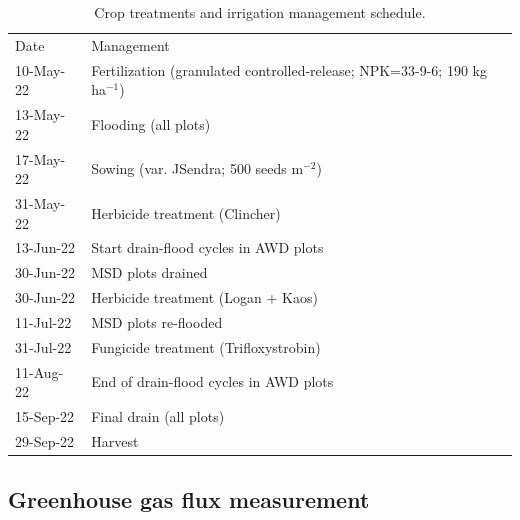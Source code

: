 \begin{table} [htbp]
    \centering
    \footnotesize  
        \caption{Crop treatments and irrigation management schedule.}
    \begin{tabular}{l l}
\cline{1-2}
{Date} & {Management} \\
\cline{1-2}
{10-May-22} & {Fertilization (granulated controlled-release; NPK=33-9-6; 190 kg ha$^{-1}$)} \\
{13-May-22} & {Flooding (all plots)} \\
{17-May-22} & {Sowing (var. JSendra; 500 seeds m$^{-2}$)} \\
{31-May-22} & {Herbicide treatment (Clincher)} \\
{13-Jun-22} & {Start drain-flood cycles in  AWD plots} \\
{30-Jun-22} & {MSD plots drained} \\
{30-Jun-22} & {Herbicide treatment (Logan + Kaos)} \\
{11-Jul-22} & {MSD plots re-flooded} \\
{31-Jul-22} & {Fungicide treatment (Trifloxystrobin)} \\
{11-Aug-22} & {End of drain-flood cycles in  AWD plots} \\
{15-Sep-22} & {Final drain (all plots)} \\
{29-Sep-22} & {Harvest} \\
\cline{1-2}
    \end{tabular}
    \label{field_mgmt}
\end{table} 


\subsection{Greenhouse gas flux measurement}
\label{sec:meth_GHG}

